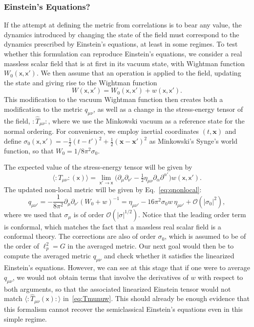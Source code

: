 \documentclass[letterpaper,12pt,titlepage,oneside,final]{book}
\newcommand{\normord}[1]{\vcentcolon\mathrel{#1}\vcentcolon}
\providecommand{\vcentcolon}{\mathrel{\mathop{:}}}
\newcommand{\mf}{\mathsf}%
\begin{document}
\subsubsection*{Einstein's Equations?}

If the attempt at defining the metric from correlations is to bear any value, the dynamics introduced by changing the state of the field must correspond to the dynamics prescribed by Einstein's equations, at least in some regimes. To test whether this formulation can reproduce Einstein's equations, we consider a real massless scalar field that is at first in its vacuum state, with Wightman function $W_0(\mf x, \mf x')$. We then assume that an operation is applied to the field, updating the state and giving rise to the Wightman function
\begin{equation}
    W(\mf x, \mf x') = W_0(\mf x, \mf x') + w(\mf x, \mf x').
\end{equation}
This modification to the vacuum Wightman function then creates both a modification to the metric $q_{\mu\nu}$, as well as a change in the stress-energy tensor of the field, $\normord{\hat{T}_{\mu\nu}}$, where we use the Minkowski vacuum as a reference state for the normal ordering. For convenience, we employ inertial coordinates $(t,\bm x)$ and define $\sigma_0(\mf x, \mf x') = -\tfrac{1}{2}(t-t')^2 + \frac{1}{2}(\bm x - \bm x')^2$ as Minkowski's Synge's world function, so that $W_0 = 1/8\pi^2\sigma_0$.


The expected value of the stress-energy tensor will be given by
\begin{equation}\label{eq:Tmunuw}
    \langle \normord{\hat{T}_{\mu\nu}}(\mf x)\rangle  = \lim_{\mf x'\to\mf x}\big(\partial_\mu \partial_{\nu'} - \tfrac{1}{2}\eta_{\mu\nu}  \partial_\alpha \partial^{\alpha'}\big) w(\mf x, \mf x').
\end{equation}
The updated non-local metric will be given by Eq.~\eqref{eq:qnonlocal}:
\begin{equation}\label{eq:Gmunutwopts}
    q_{\mu\nu'} = - \frac{1}{8\pi^2}\partial_\mu \partial_{\nu'}(W_0 + w)^{-1} = \eta_{\mu\nu'} - 16\pi^2 \sigma_0 w \,\eta_{\mu\nu'} + \mathcal{O}(|\sigma_0|^{2}),
\end{equation}
where we used that $\sigma_\mu$ is of order $\mathcal{O}(|\sigma|^{1/2})$. Notice that the leading order term is conformal, which matches the fact that a massless real scalar field is a conformal theory. The corrections are also of order $\sigma_0$, which is assumed to be of the order of $\ell_p^2 = G$ in the averaged metric. Our next goal would then be to compute the averaged metric $q_{\mu\nu}$ and check whether it satisfies the linearized Einstein's equations. However, we can see at this stage that if one were to average $q_{\mu\nu}$, we would not obtain terms that involve the derivatives of $w$ with respect to both arguments, so that the associated linearized Einstein tensor would not match $\langle \normord{\hat{T}_{\mu\nu}(\mf x)}\rangle$ in~\eqref{eq:Tmunuw}. This should already be enough evidence that this formalism cannot recover the semiclassical Einstein's equations even in this simple regime.
\end{document}
